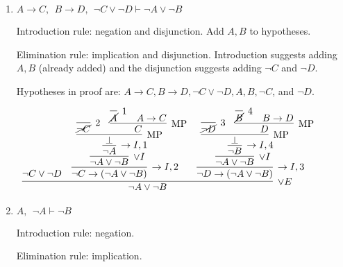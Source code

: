 \documentclass[11pt]{report}
\begin{document}
\begin{enumerate}
\begin{enumerate}
		\newpage
		\item $A \to C,\ \ B \to D,\ \ \lnot C \lor \neg D \vdash \lnot A \lor \neg B$
				
		\hspace{0.2cm}{\bf Solution}

		Introduction rule: negation and disjunction. Add $A,B$ to hypotheses.
			
		\vspace{0.2cm}
			
		Elimination rule: implication and disjunction. Introduction suggests adding $A,B$ (already added) and the disjunction suggests adding $\lnot C$ and $\lnot D$. 
		
		\vspace{0.2cm}

		Hypotheses in proof are: $A \to C, B \to D, \lnot C \lor \neg D, A, B, \lnot C$, and $\lnot D$. 

		\begin{mdframed}
			\begin{center}
				$\begin{array}{c}
					\infer[\lor E]{\lnot A \lor \lnot B}
						{\lnot C \lor \lnot D
							&
						\infer[\to I,2]{\lnot C \to (\lnot A \lor \lnot B)}
							{\infer[\lor I]{\lnot A \lor \lnot B}
								{\infer[\to I,1]{\lnot A}
									{\infer[\MP]{\bot}
										{\infer[2]{\cancel{\lnot C}}{}
										&
										\infer[\MP]{C}
											{\infer[1]{\cancel{A}}{}
											&
											A \to C}}}}}
							&
						\infer[\to I,3]{\lnot D \to (\lnot A \lor \lnot B)}
						{\infer[\lor I]{\lnot A \lor \lnot B}
							{\infer[\to I,4]{\lnot B}
								{\infer[\MP]{\bot}
									{\infer[3]{\cancel{\lnot D}}{}
									&
									\infer[\MP]{D}
										{\infer[4]{\cancel{B}}{}
										&
										B \to D}}}}}}
				\end{array}$
			\end{center}
		\end{mdframed}

		\item $A,\ \ \neg A \vdash  \neg B$
				
		\hspace{0.2cm}{\bf Solution}

		Introduction rule: negation. 
			
		\vspace{0.2cm}
			
		Elimination rule: implication.
		
		\vspace{0.2cm}


\end{enumerate}
\end{enumerate}
\end{document}
